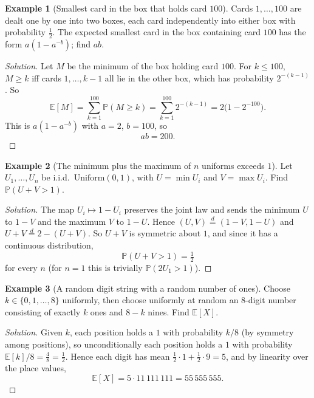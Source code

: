 \documentclass[11pt]{article}
\theoremstyle{definition}
\newtheorem{example}{Example}[section]
\newcommand{\E}{\mathbb{E}}
\begin{document}
\begin{example}[Smallest card in the box that holds card $100$]
Cards $1,\dots,100$ are dealt one by one into two boxes, each card independently into either box with probability $\tfrac12$. The expected smallest card in the box containing card $100$ has the form $a(1-a^{-b})$; find $ab$.
\end{example}

\begin{proof}[Solution]
Let $M$ be the minimum of the box holding card $100$. For $k\le100$, $M\ge k$ iff cards $1,\dots,k-1$ all lie in the other box, which has probability $2^{-(k-1)}$. So
\[
\E[M]=\sum_{k=1}^{100}\mathbb P(M\ge k)=\sum_{k=1}^{100}2^{-(k-1)}=2\bigl(1-2^{-100}\bigr).
\]
This is $a(1-a^{-b})$ with $a=2$, $b=100$, so
\[
\boxed{ab=200}.
\]
\end{proof}

\begin{example}[The minimum plus the maximum of $n$ uniforms exceeds $1$]
Let $U_1,\dots,U_n$ be i.i.d.\ $\mathrm{Uniform}(0,1)$, with $U=\min U_i$ and $V=\max U_i$. Find $\mathbb P(U+V>1)$.
\end{example}

\begin{proof}[Solution]
The map $U_i\mapsto1-U_i$ preserves the joint law and sends the minimum $U$ to $1-V$ and the maximum $V$ to $1-U$. Hence $(U,V)\overset{d}{=}(1-V,1-U)$ and $U+V\overset d=2-(U+V)$. So $U+V$ is symmetric about $1$, and since it has a continuous distribution,
\[
\mathbb P(U+V>1)=\boxed{\tfrac12}
\]
for every $n$ (for $n=1$ this is trivially $\mathbb P(2U_1>1)$).
\end{proof}

\begin{example}[A random digit string with a random number of ones]
Choose $k\in\{0,1,\dots,8\}$ uniformly, then choose uniformly at random an $8$-digit number consisting of exactly $k$ ones and $8-k$ nines. Find $\E[X]$.
\end{example}

\begin{proof}[Solution]
Given $k$, each position holds a $1$ with probability $k/8$ (by symmetry among positions), so unconditionally each position holds a $1$ with probability $\E[k]/8=\tfrac48=\tfrac12$. Hence each digit has mean $\tfrac12\cdot1+\tfrac12\cdot9=5$, and by linearity over the place values,
\[
\E[X]=5\cdot11\,111\,111=\boxed{55\,555\,555}.
\]
\end{proof}
\end{document}

